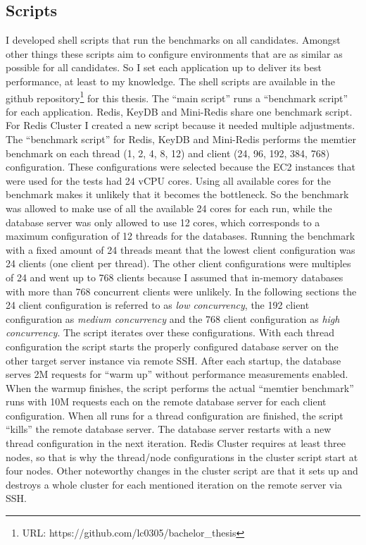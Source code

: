 \subsection{Scripts}
I developed shell scripts that run the benchmarks on all candidates. Amongst other things these scripts aim to configure environments that are as similar as possible for all candidates. So I set each application up to deliver its best performance, at least to my knowledge. The shell scripts are available in the github repository\footnote{URL: https://github.com/lc0305/bachelor\_thesis} for this thesis.
The “main script” runs a “benchmark script” for each application. Redis, KeyDB and Mini-Redis share one benchmark script. For Redis Cluster I created a new script because it needed multiple adjustments. \newline
The “benchmark script” for Redis, KeyDB and Mini-Redis performs the memtier benchmark on each thread (1, 2, 4, 8, 12) and client (24, 96, 192, 384, 768) configuration. These configurations were selected because the EC2 instances that were used for the tests had 24 vCPU cores. Using all available cores for the benchmark makes it unlikely that it becomes the bottleneck. So the benchmark was allowed to make use of all the available 24 cores for each run, while the database server was only allowed to use 12 cores, which corresponds to a maximum configuration of 12 threads for the databases. Running the benchmark with a fixed amount of 24 threads meant that the lowest client configuration was 24 clients (one client per thread). The other client configurations were multiples of 24 and went up to 768 clients because I assumed that in-memory databases with more than 768 concurrent clients were unlikely. In the following sections the 24 client configuration is referred to as \textit{low concurrency}, the 192 client configuration as \textit{medium concurrency} and the 768 client configuration as \textit{high concurrency}. \newline
The script iterates over these configurations. With each thread configuration the script starts the properly configured database server on the other target server instance via remote SSH. After each startup, the database serves 2M requests for “warm up” without performance measurements enabled. When the warmup finishes, the script performs the actual “memtier benchmark” runs with 10M requests each on the remote database server for each client configuration. When all runs for a thread configuration are finished, the script “kills” the remote database server. The database server restarts with a new thread configuration in the next iteration. \newline
Redis Cluster requires at least three nodes, so that is why the thread/node configurations in the cluster script start at four nodes. Other noteworthy changes in the cluster script are that it sets up and destroys a whole cluster for each mentioned iteration on the remote server via SSH.

